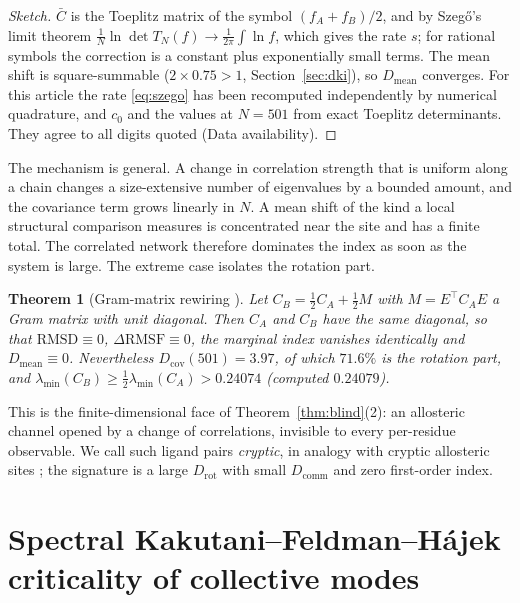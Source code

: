\documentclass[11pt,reqno]{amsart}
\theoremstyle{plain}
\newtheorem{theorem}{Theorem}[section]
\theoremstyle{definition}
\theoremstyle{remark}
\numberwithin{equation}{section}
\begin{document}
\begin{proof}[Sketch]
$\bar C$ is the Toeplitz matrix of the symbol $(f_A+f_B)/2$, and by Szeg\H{o}'s limit theorem \cite{GrenanderSzego1958} $\frac1N\ln\det T_N(f)\to\frac1{2\pi}\int\ln f$, which gives the rate $s$; for rational symbols the correction is a constant plus exponentially small terms. The mean shift is square-summable ($2\times0.75>1$, Section~\ref{sec:dki}), so $D_{\mathrm{mean}}$ converges. For this article the rate \eqref{eq:szego} has been recomputed independently by numerical quadrature, and $c_0$ and the values at $N=501$ from exact Toeplitz determinants. They agree to all digits quoted (Data availability).
\end{proof}

The mechanism is general. A change in correlation strength that is uniform along a chain changes a size-extensive number of eigenvalues by a bounded amount, and the covariance term grows linearly in $N$. A mean shift of the kind a local structural comparison measures is concentrated near the site and has a finite total. The correlated network therefore dominates the index as soon as the system is large. The extreme case isolates the rotation part.

\begin{theorem}[Gram-matrix rewiring \cite{ChenChen2026II}]\label{thm:rewiring}
Let $C_B=\tfrac12C_A+\tfrac12M$ with $M=E^{\top}C_AE$ a Gram matrix with unit diagonal. Then $C_A$ and $C_B$ have the same diagonal, so that $\mathrm{RMSD}\equiv0$, $\Delta\mathrm{RMSF}\equiv0$, the marginal index vanishes identically and $D_{\mathrm{mean}}\equiv0$. Nevertheless $D_{\mathrm{cov}}(501)=3.97$, of which $71.6\%$ is the rotation part, and $\lambda_{\min}(C_B)\ge\tfrac12\lambda_{\min}(C_A)>0.24074$ (computed $0.24079$).
\end{theorem}

This is the finite-dimensional face of Theorem~\ref{thm:blind}(2): an allosteric channel opened by a change of correlations, invisible to every per-residue observable. We call such ligand pairs \emph{cryptic}, in analogy with cryptic allosteric sites \cite{Bowman2012}; the signature is a large $D_{\mathrm{rot}}$ with small $D_{\mathrm{comm}}$ and zero first-order index.

\section{Spectral Kakutani--Feldman--H\'ajek criticality of collective modes}
\label{sec:spectral}
\end{document}
